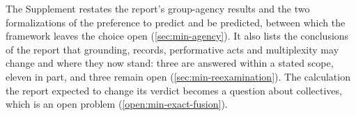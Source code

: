 The Supplement restates the report's group-agency results and the two formalizations of the preference to predict and be predicted, between which the framework leaves the choice open (\cref{sec:min-agency}). It also lists the conclusions of the report that grounding, records, performative acts and multiplexity may change and where they now stand: three are answered within a stated scope, eleven in part, and three remain open (\cref{sec:min-reexamination}). The calculation the report expected to change its verdict becomes a question about collectives, which is an open problem (\cref{open:min-exact-fusion}).

